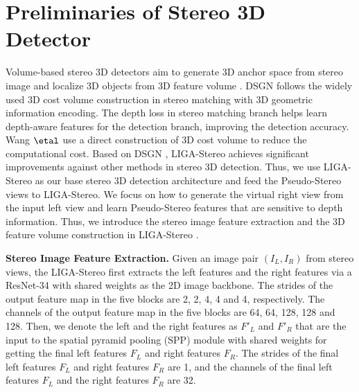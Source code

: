 \documentclass[10pt,twocolumn,letterpaper]{article}
\begin{document}
\section{Preliminaries of Stereo 3D Detector}\label{sec:liga}
Volume-based stereo 3D detectors aim to generate 3D anchor space from stereo image \cite{qin2019triangulation} and localize 3D objects from 3D feature volume \cite{chen2020dsgn,wang2021plume,guo2021liga}. DSGN \cite{chen2020dsgn} follows the widely used 3D cost volume construction in stereo matching \cite{xu2020aanet,tankovich2021hitnet,gu2020cascade} with 3D geometric information encoding. The depth loss in stereo matching branch helps learn depth-aware features for the detection branch, improving the detection accuracy. Wang $\etal$ \cite{wang2021plume} use a direct construction of 3D cost volume to reduce the computational cost. Based on DSGN \cite{chen2020dsgn}, LIGA-Stereo \cite{guo2021liga} achieves significant improvements against other methods \cite{chen2020dsgn,PL++,bewley2020range} in stereo 3D detection. Thus, we use LIGA-Stereo \cite{guo2021liga} as our base stereo 3D detection architecture and feed the Pseudo-Stereo views to LIGA-Stereo. We focus on how to generate the virtual right view from the input left view and learn Pseudo-Stereo features that are sensitive to depth information. Thus, we introduce the stereo image feature extraction and the 3D feature volume construction in LIGA-Stereo \cite{guo2021liga}. 

\textbf{Stereo Image Feature Extraction.}
Given an image pair $(I_L, I_R)$ from stereo views, the LIGA-Stereo \cite{guo2021liga} first extracts the left features and the right features via a ResNet-34 \cite{he2016deep} with shared weights as the 2D image backbone.
The strides of the output feature map in the five blocks are 2, 2, 4, 4 and 4, respectively. The channels of the output feature map in the five blocks are 64, 64, 128, 128 and 128. Then, we denote the left and the right features as $F'_L$ and $F'_R$ that are the input to the spatial pyramid pooling (SPP) module \cite{chang2018pyramid} with shared weights for getting the final left features $F_L$ and right features $F_R$. The strides of the final left features $F_L$ and right features $F_R$ are 1, and the channels of the final left features $F_L$ and the right features $F_R$ are 32.
\end{document}

